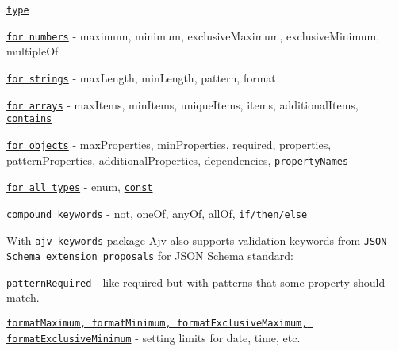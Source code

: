 \begin{DoxyItemize}
\item \href{https://github.com/epoberezkin/ajv/blob/master/KEYWORDS.md#type}{\tt type}
\item \href{https://github.com/epoberezkin/ajv/blob/master/KEYWORDS.md#keywords-for-numbers}{\tt for numbers} -\/ maximum, minimum, exclusive\+Maximum, exclusive\+Minimum, multiple\+Of
\item \href{https://github.com/epoberezkin/ajv/blob/master/KEYWORDS.md#keywords-for-strings}{\tt for strings} -\/ max\+Length, min\+Length, pattern, format
\item \href{https://github.com/epoberezkin/ajv/blob/master/KEYWORDS.md#keywords-for-arrays}{\tt for arrays} -\/ max\+Items, min\+Items, unique\+Items, items, additional\+Items, \href{https://github.com/epoberezkin/ajv/blob/master/KEYWORDS.md#contains}{\tt contains}
\item \href{https://github.com/epoberezkin/ajv/blob/master/KEYWORDS.md#keywords-for-objects}{\tt for objects} -\/ max\+Properties, min\+Properties, required, properties, pattern\+Properties, additional\+Properties, dependencies, \href{https://github.com/epoberezkin/ajv/blob/master/KEYWORDS.md#propertynames}{\tt property\+Names}
\item \href{https://github.com/epoberezkin/ajv/blob/master/KEYWORDS.md#keywords-for-all-types}{\tt for all types} -\/ enum, \href{https://github.com/epoberezkin/ajv/blob/master/KEYWORDS.md#const}{\tt const}
\item \href{https://github.com/epoberezkin/ajv/blob/master/KEYWORDS.md#compound-keywords}{\tt compound keywords} -\/ not, one\+Of, any\+Of, all\+Of, \href{https://github.com/epoberezkin/ajv/blob/master/KEYWORDS.md#ifthenelse}{\tt if/then/else}
\end{DoxyItemize}

With \href{https://github.com/epoberezkin/ajv-keywords}{\tt ajv-\/keywords} package Ajv also supports validation keywords from \href{https://github.com/json-schema/json-schema/wiki/v5-Proposals}{\tt J\+S\+ON Schema extension proposals} for J\+S\+ON Schema standard\+:


\begin{DoxyItemize}
\item \href{https://github.com/epoberezkin/ajv/blob/master/KEYWORDS.md#patternrequired-proposed}{\tt pattern\+Required} -\/ like {\ttfamily required} but with patterns that some property should match.
\item \href{https://github.com/epoberezkin/ajv/blob/master/KEYWORDS.md#formatmaximum--formatminimum-and-exclusiveformatmaximum--exclusiveformatminimum-proposed}{\tt format\+Maximum, format\+Minimum, format\+Exclusive\+Maximum, format\+Exclusive\+Minimum} -\/ setting limits for date, time, etc.
\end{DoxyItemize}

